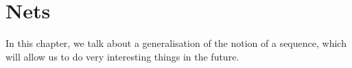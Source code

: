 \chapter{Nets}
\thispagestyle{empty}

In this chapter, we talk about a generalisation of the notion of a sequence, which will allow us to do very interesting things in the future.


